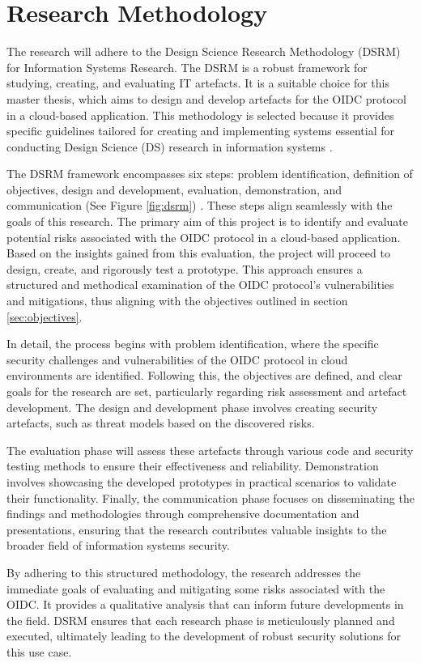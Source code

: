 \section{Research Methodology}
The research will adhere to the Design Science Research Methodology (DSRM) for Information Systems Research. The DSRM is a robust framework for studying, creating, and evaluating IT artefacts. It is a suitable choice for this master thesis, which aims to design and develop artefacts for the OIDC protocol in a cloud-based application. This methodology is selected because it provides specific guidelines tailored for creating and implementing systems essential for conducting Design Science (DS) research in information systems \citep{dsrm}.

The DSRM framework encompasses six steps: problem identification, definition of objectives, design and development, evaluation, demonstration, and communication (See Figure \ref{fig:dsrm}) \citep{dsrm}. These steps align seamlessly with the goals of this research. The primary aim of this project is to identify and evaluate potential risks associated with the OIDC protocol in a cloud-based application. Based on the insights gained from this evaluation, the project will proceed to design, create, and rigorously test a prototype. This approach ensures a structured and methodical examination of the OIDC protocol’s vulnerabilities and mitigations, thus aligning with the objectives outlined in section \ref{sec:objectives}.

In detail, the process begins with problem identification, where the specific security challenges and vulnerabilities of the OIDC protocol in cloud environments are identified. Following this, the objectives are defined, and clear goals for the research are set, particularly regarding risk assessment and artefact development. The design and development phase involves creating security artefacts, such as threat models based on the discovered risks.

The evaluation phase will assess these artefacts through various code and security testing methods to ensure their effectiveness and reliability. Demonstration involves showcasing the developed prototypes in practical scenarios to validate their functionality. Finally, the communication phase focuses on disseminating the findings and methodologies through comprehensive documentation and presentations, ensuring that the research contributes valuable insights to the broader field of information systems security.

By adhering to this structured methodology, the research addresses the immediate goals of evaluating and mitigating some risks associated with the OIDC. It provides a qualitative analysis that can inform future developments in the field. DSRM ensures that each research phase is meticulously planned and executed, ultimately leading to the development of robust security solutions for this use case.

